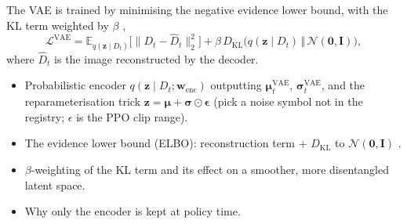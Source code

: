 The VAE is trained by minimising the negative evidence lower bound, with the KL term weighted by $\beta$ \parencite{kingma2014auto},
\begin{equation}
  \mathcal{L}^{\mathrm{VAE}} = \mathbb{E}_{q(\mathbf{z}\mid D_t)}\bigl[\lVert D_t - \hat D_t \rVert_2^2\bigr]
  + \beta\, D_{\mathrm{KL}}\bigl(q(\mathbf{z}\mid D_t)\,\Vert\,\mathcal{N}(\mathbf{0},\mathbf{I})\bigr),
  \label{eq:vae-loss}
\end{equation}
where $\hat D_t$ is the image reconstructed by the decoder.

\begin{itemize}
  \item Probabilistic encoder $q(\mathbf{z}\mid D_t;\mathbf{w}_{\mathrm{enc}})$ outputting
        $\boldsymbol{\mu}^{\mathrm{VAE}}_t$, $\boldsymbol{\sigma}^{\mathrm{VAE}}_t$, and the
        reparameterisation trick $\mathbf{z} = \boldsymbol{\mu} + \boldsymbol{\sigma}\odot\boldsymbol{\epsilon}$
        (pick a noise symbol not in the registry; $\epsilon$ is the PPO clip range).
  \item The evidence lower bound (ELBO): reconstruction term + $D_{\mathrm{KL}}$ to
        $\mathcal{N}(\mathbf{0},\mathbf{I})$ \parencite{kingma2014auto}.
  \item $\beta$-weighting of the KL term and its effect on a smoother, more
        disentangled latent space.
  \item Why only the encoder is kept at policy time.
\end{itemize}

